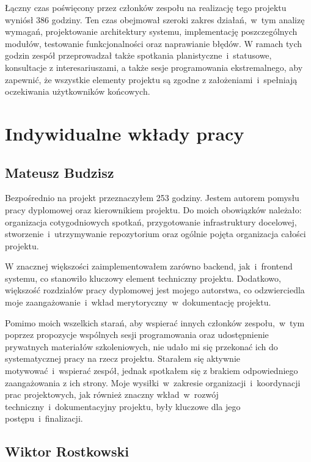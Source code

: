 Łączny czas poświęcony przez członków zespołu na realizację tego projektu wyniósł 386 godziny.
Ten czas obejmował szeroki zakres działań,~w~tym analizę wymagań, projektowanie architektury systemu, implementację poszczególnych modułów, testowanie funkcjonalności oraz naprawianie błędów.
W ramach tych godzin zespół przeprowadzał także spotkania planistyczne~i~statusowe, konsultacje z interesariuszami, a także sesje programowania ekstremalnego, aby zapewnić, że wszystkie elementy projektu są zgodne z założeniami~i~spełniają oczekiwania użytkowników końcowych.

\section{Indywidualne wkłady pracy}
\label{sec:indywidualne-wklady-pracy}

\subsection{Mateusz Budzisz}
\label{subsec:mateusz-budzisz}

Bezpośrednio na projekt przeznaczyłem 253 godziny.
Jestem autorem pomysłu pracy dyplomowej oraz kierownikiem projektu.
Do moich obowiązków należało: organizacja cotygodniowych spotkań, przygotowanie infrastruktury docelowej, stworzenie~i~utrzymywanie repozytorium oraz ogólnie pojęta organizacja całości projektu.

W znacznej większości zaimplementowałem zarówno backend, jak~i~frontend systemu, co stanowiło kluczowy element techniczny projektu.
Dodatkowo, większość rozdziałów pracy dyplomowej jest mojego autorstwa, co odzwierciedla moje zaangażowanie~i~wkład merytoryczny~w~dokumentację projektu.

Pomimo moich wszelkich starań, aby wspierać innych członków zespołu,~w~tym poprzez propozycje wspólnych sesji programowania oraz udostępnienie prywatnych materiałów szkoleniowych, nie udało mi się przekonać ich do systematycznej pracy na rzecz projektu.
Starałem się aktywnie motywować~i~wspierać zespół, jednak spotkałem się z brakiem odpowiedniego zaangażowania z ich strony.
Moje wysiłki~w~zakresie organizacji~i~koordynacji prac projektowych, jak również znaczny wkład~w~rozwój techniczny~i~dokumentacyjny projektu, były kluczowe dla jego postępu~i~finalizacji.

\subsection{Wiktor Rostkowski}
\label{subsec:wiktor-rostkowski}

